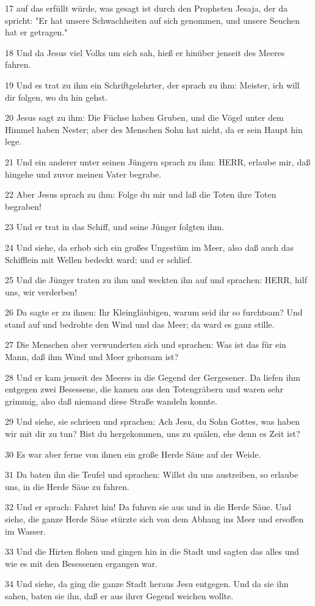 \par 17 auf das erfüllt würde, was gesagt ist durch den Propheten Jesaja, der da spricht: "Er hat unsere Schwachheiten auf sich genommen, und unsere Seuchen hat er getragen."
\par 18 Und da Jesus viel Volks um sich sah, hieß er hinüber jenseit des Meeres fahren.
\par 19 Und es trat zu ihm ein Schriftgelehrter, der sprach zu ihm: Meister, ich will dir folgen, wo du hin gehst.
\par 20 Jesus sagt zu ihm: Die Füchse haben Gruben, und die Vögel unter dem Himmel haben Nester; aber des Menschen Sohn hat nicht, da er sein Haupt hin lege.
\par 21 Und ein anderer unter seinen Jüngern sprach zu ihm: HERR, erlaube mir, daß hingehe und zuvor meinen Vater begrabe.
\par 22 Aber Jesus sprach zu ihm: Folge du mir und laß die Toten ihre Toten begraben!
\par 23 Und er trat in das Schiff, und seine Jünger folgten ihm.
\par 24 Und siehe, da erhob sich ein großes Ungestüm im Meer, also daß auch das Schifflein mit Wellen bedeckt ward; und er schlief.
\par 25 Und die Jünger traten zu ihm und weckten ihn auf und sprachen: HERR, hilf uns, wir verderben!
\par 26 Da sagte er zu ihnen: Ihr Kleingläubigen, warum seid ihr so furchtsam? Und stand auf und bedrohte den Wind und das Meer; da ward es ganz stille.
\par 27 Die Menschen aber verwunderten sich und sprachen: Was ist das für ein Mann, daß ihm Wind und Meer gehorsam ist?
\par 28 Und er kam jenseit des Meeres in die Gegend der Gergesener. Da liefen ihm entgegen zwei Besessene, die kamen aus den Totengräbern und waren sehr grimmig, also daß niemand diese Straße wandeln konnte.
\par 29 Und siehe, sie schrieen und sprachen: Ach Jesu, du Sohn Gottes, was haben wir mit dir zu tun? Bist du hergekommen, uns zu quälen, ehe denn es Zeit ist?
\par 30 Es war aber ferne von ihnen ein große Herde Säue auf der Weide.
\par 31 Da baten ihn die Teufel und sprachen: Willst du uns austreiben, so erlaube uns, in die Herde Säue zu fahren.
\par 32 Und er sprach: Fahret hin! Da fuhren sie aus und in die Herde Säue. Und siehe, die ganze Herde Säue stürzte sich von dem Abhang ins Meer und ersoffen im Wasser.
\par 33 Und die Hirten flohen und gingen hin in die Stadt und sagten das alles und wie es mit den Besessenen ergangen war.
\par 34 Und siehe, da ging die ganze Stadt heraus Jesu entgegen. Und da sie ihn sahen, baten sie ihn, daß er aus ihrer Gegend weichen wollte.

